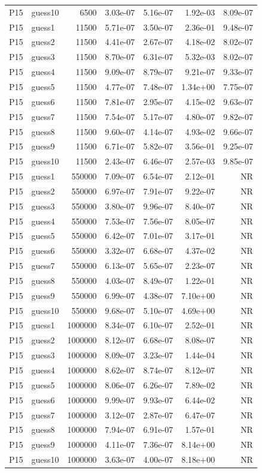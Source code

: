 {\begin{longtable}{llrrrrr}
P15 & guess10 & 6500 & 3.03e-07 & 5.16e-07 & 1.92e-03 & 8.09e-07 \\
P15 & guess1 & 11500 & 5.71e-07 & 3.50e-07 & 2.36e-01 & 9.48e-07 \\
P15 & guess2 & 11500 & 4.41e-07 & 2.67e-07 & 4.18e-02 & 8.02e-07 \\
P15 & guess3 & 11500 & 8.70e-07 & 6.31e-07 & 5.32e-03 & 8.02e-07 \\
P15 & guess4 & 11500 & 9.09e-07 & 8.79e-07 & 9.21e-07 & 9.33e-07 \\
P15 & guess5 & 11500 & 4.77e-07 & 7.48e-07 & 1.34e+00 & 7.75e-07 \\
P15 & guess6 & 11500 & 7.81e-07 & 2.95e-07 & 4.15e-02 & 9.63e-07 \\
P15 & guess7 & 11500 & 7.54e-07 & 5.17e-07 & 4.80e-07 & 9.82e-07 \\
P15 & guess8 & 11500 & 9.60e-07 & 4.14e-07 & 4.93e-02 & 9.66e-07 \\
P15 & guess9 & 11500 & 6.71e-07 & 5.82e-07 & 3.56e-01 & 9.25e-07 \\
P15 & guess10 & 11500 & 2.43e-07 & 6.46e-07 & 2.57e-03 & 9.85e-07 \\
P15 & guess1 & 550000 & 7.09e-07 & 6.54e-07 & 2.12e-01 & NR \\
P15 & guess2 & 550000 & 6.97e-07 & 7.91e-07 & 9.22e-07 & NR \\
P15 & guess3 & 550000 & 3.80e-07 & 9.96e-07 & 8.40e-07 & NR \\
P15 & guess4 & 550000 & 7.53e-07 & 7.56e-07 & 8.05e-07 & NR \\
P15 & guess5 & 550000 & 6.42e-07 & 7.01e-07 & 3.17e-01 & NR \\
P15 & guess6 & 550000 & 3.32e-07 & 6.68e-07 & 4.37e-02 & NR \\
P15 & guess7 & 550000 & 6.13e-07 & 5.65e-07 & 2.23e-07 & NR \\
P15 & guess8 & 550000 & 4.03e-07 & 8.49e-07 & 1.22e-01 & NR \\
P15 & guess9 & 550000 & 6.99e-07 & 4.38e-07 & 7.10e+00 & NR \\
P15 & guess10 & 550000 & 9.68e-07 & 5.10e-07 & 4.69e+00 & NR \\
P15 & guess1 & 1000000 & 8.34e-07 & 6.10e-07 & 2.52e-01 & NR \\
P15 & guess2 & 1000000 & 8.12e-07 & 6.68e-07 & 8.08e-07 & NR \\
P15 & guess3 & 1000000 & 8.09e-07 & 3.23e-07 & 1.44e-04 & NR \\
P15 & guess4 & 1000000 & 8.62e-07 & 8.74e-07 & 8.12e-07 & NR \\
P15 & guess5 & 1000000 & 8.06e-07 & 6.26e-07 & 7.89e-02 & NR \\
P15 & guess6 & 1000000 & 9.99e-07 & 9.93e-07 & 6.44e-02 & NR \\
P15 & guess7 & 1000000 & 3.12e-07 & 2.87e-07 & 6.47e-07 & NR \\
P15 & guess8 & 1000000 & 7.94e-07 & 6.91e-07 & 1.57e-01 & NR \\
P15 & guess9 & 1000000 & 4.11e-07 & 7.36e-07 & 8.14e+00 & NR \\
P15 & guess10 & 1000000 & 3.63e-07 & 4.00e-07 & 8.18e+00 & NR \\
\end{longtable}}

